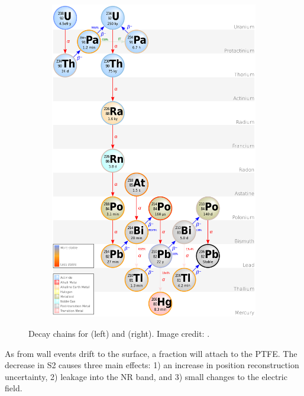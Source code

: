 \begin{figure}
\begin{subfigure}[t]{0.5\textwidth}
    \end{subfigure}%
    \begin{subfigure}[t]{0.5\textwidth}
        \centering
        \includegraphics[width=\textwidth]{Decay_Chain_of_Uranium-238}
    \end{subfigure}
    \caption{Decay chains for  (left) and  (right).  Image credit: .}
	\label{fig:backgrounds_decay_chains}
\end{figure}

As \electron from wall events drift to the surface, a fraction will attach to the PTFE.  The decrease in S2 causes three main effects: 1)
an increase in position reconstruction uncertainty, 2) leakage into the NR band, and 3) small changes to the electric field.

